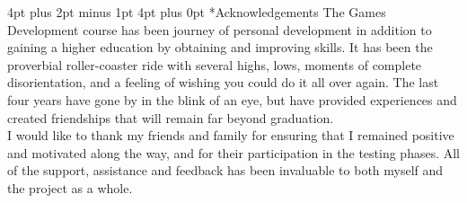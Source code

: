 \documentclass[12pt,a4paper]{article}
\makeatletter
\renewcommand\section{\@startsection {section}{1}{0mm} %
                               {4pt plus 2pt minus 1pt} %
                               {4pt plus 0pt} %
                               {\bfseries}}
\makeatother
\begin{document}


\pagebreak

\pagebreak

\begin{abstract}
$\\ \clubsuit \\\\ \diamondsuit \\\\ \heartsuit \\\\ \spadesuit$

\end{abstract}
\pagebreak

\tableofcontents %
\newpage

\listoftables
\newpage

\listoffigures
\newpage

\section*{Acknowledgements}
The Games Development course has been journey of personal development in addition to gaining a higher education by obtaining and improving skills. It has been the proverbial roller-coaster ride with several highs, lows, moments of complete disorientation, and a feeling of wishing you could do it all over again. The last four years have gone by in the blink of an eye, but have provided experiences and created friendships that will remain far beyond graduation.\\

I would like to thank my friends and family for ensuring that I remained positive and motivated along the way, and for their participation in the testing phases. All of the support, assistance and feedback has been invaluable to both myself and the project as a whole. \\
\end{document}
